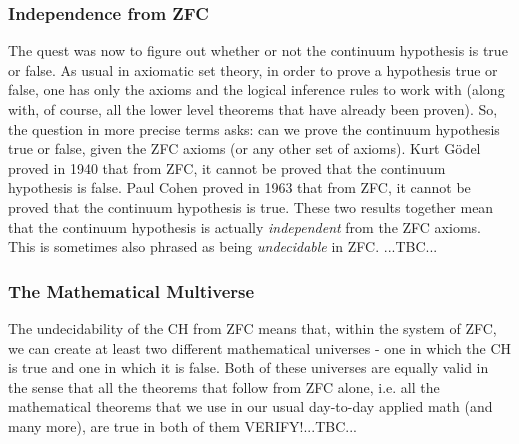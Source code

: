 








\subsubsection{Independence from ZFC}
The quest was now to figure out whether or not the continuum hypothesis is true or false. As usual in axiomatic set theory, in order to prove a hypothesis true or false, one has only the axioms and the logical inference rules to work with (along with, of course, all the lower level theorems that have already been proven). So, the question in more precise terms asks: can we prove the continuum hypothesis true or false, given the ZFC axioms (or any other set of axioms). Kurt Gödel proved in 1940 that from ZFC, it cannot be proved that the continuum hypothesis is false. Paul Cohen proved in 1963 that from ZFC, it cannot be proved that the continuum hypothesis is true. These two results together mean that the continuum hypothesis is actually \emph{independent} from the ZFC axioms. This is sometimes also phrased as being \emph{undecidable} in ZFC. ...TBC...


\subsubsection{The Mathematical Multiverse}
The undecidability of the CH from ZFC means that, within the system of ZFC, we can create at least two different mathematical universes - one in which the CH is true and one in which it is false. Both of these universes are equally valid in the sense that all the theorems that follow from ZFC alone, i.e. all the mathematical theorems that we use in our usual day-to-day applied math (and many more), are true in both of them VERIFY!...TBC...

